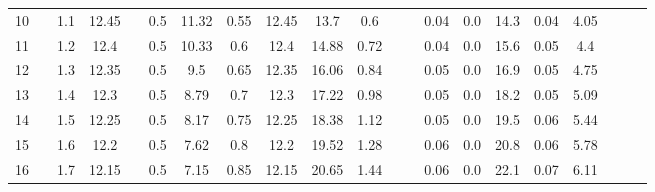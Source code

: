 \documentclass[a4paper,12pt]{article}
\begin{document}
\begin{table}[htp]
\begin{adjustwidth}{-2.2cm}{}
\begin{tabular}{|c|c|c|c|c|c|c|c|c|c|c|c|c|c|c|c|c|c|c|c|c|}
10    &                      & 1.1 & 12.45 &                       & 0.5  & 11.32 & 0.55 & 12.45 & 13.7  & 0.6  &                        &                         & 0.04      & 0.0       & 14.3 & 0.04   & 4.05       &                       &                       &                       \\ \cline{1-1} \cline{3-4} \cline{6-11} \cline{14-18}
11    &                      & 1.2 & 12.4  &                       & 0.5  & 10.33 & 0.6  & 12.4  & 14.88 & 0.72 &                        &                         & 0.04      & 0.0       & 15.6 & 0.05   & 4.4        &                       &                       &                       \\ \cline{1-1} \cline{3-4} \cline{6-11} \cline{14-18}
12    &                      & 1.3 & 12.35 &                       & 0.5  & 9.5   & 0.65 & 12.35 & 16.06 & 0.84 &                        &                         & 0.05      & 0.0       & 16.9 & 0.05   & 4.75       &                       &                       &                       \\ \cline{1-1} \cline{3-4} \cline{6-11} \cline{14-18}
13    &                      & 1.4 & 12.3  &                       & 0.5  & 8.79  & 0.7  & 12.3  & 17.22 & 0.98 &                        &                         & 0.05      & 0.0       & 18.2 & 0.05   & 5.09       &                       &                       &                       \\ \cline{1-1} \cline{3-4} \cline{6-11} \cline{14-18}
14    &                      & 1.5 & 12.25 &                       & 0.5  & 8.17  & 0.75 & 12.25 & 18.38 & 1.12 &                        &                         & 0.05      & 0.0       & 19.5 & 0.06   & 5.44       &                       &                       &                       \\ \cline{1-1} \cline{3-4} \cline{6-11} \cline{14-18}
15    &                      & 1.6 & 12.2  &                       & 0.5  & 7.62  & 0.8  & 12.2  & 19.52 & 1.28 &                        &                         & 0.06      & 0.0       & 20.8 & 0.06   & 5.78       &                       &                       &                       \\ \cline{1-1} \cline{3-4} \cline{6-11} \cline{14-18}
16    &                      & 1.7 & 12.15 &                       & 0.5  & 7.15  & 0.85 & 12.15 & 20.65 & 1.44 &                        &                         & 0.06      & 0.0       & 22.1 & 0.07   & 6.11       &                       &                       &                       \\ \cline{1-1} \cline{3-4} \cline{6-11} \cline{14-18}

\end{tabular}
\end{adjustwidth}
\end{table}
\end{document}
